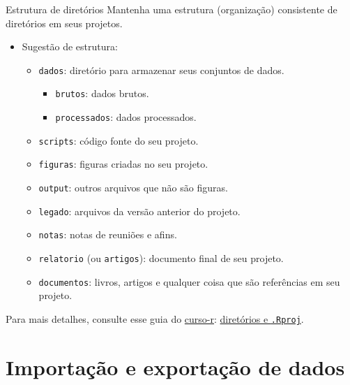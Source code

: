 \documentclass[
  10pt,
  ignorenonframetext,
]{beamer}
\providecommand{\tightlist}{%
  \setlength{\itemsep}{0pt}\setlength{\parskip}{0pt}}\usepackage{longtable,booktabs,array}
\begin{document}
\begin{frame}[fragile]{Estrutura de diretórios}
\protect\hypertarget{estrutura-de-diretuxf3rios}{}
Mantenha uma estrutura (organização) consistente de diretórios em seus
projetos.

\begin{itemize}
\tightlist
\item
  Sugestão de estrutura:

  \begin{itemize}
  \tightlist
  \item
    \texttt{dados}: diretório para armazenar seus conjuntos de dados.

    \begin{itemize}
    \tightlist
    \item
      \texttt{brutos}: dados brutos.
    \item
      \texttt{processados}: dados processados.
    \end{itemize}
  \item
    \texttt{scripts}: código fonte do seu projeto.
  \item
    \texttt{figuras}: figuras criadas no seu projeto.
  \item
    \texttt{output}: outros arquivos que não são figuras.
  \item
    \texttt{legado}: arquivos da versão anterior do projeto.
  \item
    \texttt{notas}: notas de reuniões e afins.
  \item
    \texttt{relatorio} (ou \texttt{artigos}): documento final de seu
    projeto.
  \item
    \texttt{documentos}: livros, artigos e qualquer coisa que são
    referências em seu projeto.
  \end{itemize}
\end{itemize}

Para mais detalhes, consulte esse guia do
\href{https://curso-r.com}{curso-r}:
\href{https://curso-r.github.io/zen-do-r/rproj-dir.html}{diretórios e
\texttt{.Rproj}}.
\end{frame}

\hypertarget{importauxe7uxe3o-e-exportauxe7uxe3o-de-dados}{%
\section{Importação e exportação de
dados}\label{importauxe7uxe3o-e-exportauxe7uxe3o-de-dados}}
\end{document}
